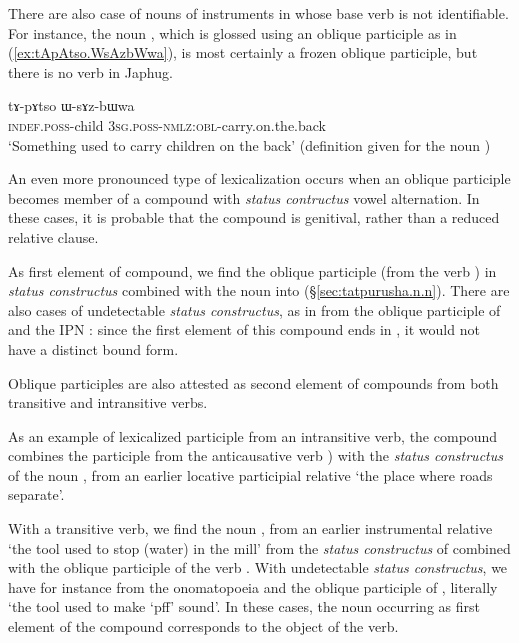 There are also case of nouns of instruments in  whose base verb is not identifiable. For instance, the noun , which is glossed using an oblique participle as in (\ref{ex:tApAtso.WsAzbWwa}), is most certainly a frozen oblique participle, but there is no verb  in Japhug.

\begin{exe}
\ex \label{ex:tApAtso.WsAzbWwa}
\gll   tɤ-pɤtso ɯ-sɤz-bɯwa \\
\textsc{indef}.\textsc{poss}-child \textsc{3sg}.\textsc{poss}-\textsc{nmlz}:\textsc{obl}-carry.on.the.back \\
\glt `Something used to carry children on the back' (definition given for the noun )
\end{exe}

An even more pronounced type of lexicalization occurs when an oblique participle becomes member of a compound with \textit{status contructus} vowel alternation. In these cases, it is probable that the compound is genitival, rather than a reduced relative clause.

As first element of compound, we find the oblique participle  (from the verb ) in \textit{status constructus} combined with the noun  into 
 (§\ref{sec:tatpurusha.n.n}). There are also cases of undetectable \textit{status constructus}, as in  from the oblique participle of  and the IPN : since the first element of this compound  ends in , it would not have a distinct bound form.

Oblique participles are also attested as second element of compounds from both transitive and intransitive verbs. 

As an example of lexicalized participle from an intransitive verb, the compound  combines the participle  from the anticausative verb ) with the \textit{status constructus} of the noun , from an earlier locative participial relative  `the place where roads separate'. 

With a transitive verb, we find the noun , from an earlier instrumental relative  `the tool used to stop (water) in the mill' from the \textit{status constructus}  of  combined with the oblique participle  of the verb . With undetectable \textit{status constructus}, we have for instance  from the  onomatopoeia  and the oblique participle of , literally `the tool used to make `pff' sound'. In these cases, the noun occurring as first element of the compound corresponds to the object of the verb.


